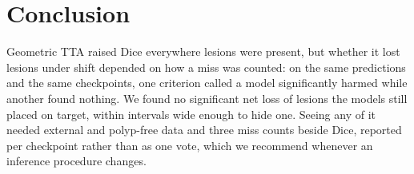 \section{Conclusion}
\label{sec:conclusion}
Geometric TTA raised Dice everywhere lesions were present, but whether it lost lesions under shift depended on how a miss was counted: on the same predictions and the same checkpoints, one criterion called a model significantly harmed while another found nothing. We found no significant net loss of lesions the models still placed on target, within intervals wide enough to hide one. Seeing any of it needed external and polyp-free data and three miss counts beside Dice, reported per checkpoint rather than as one vote, which we recommend whenever an inference procedure changes.
